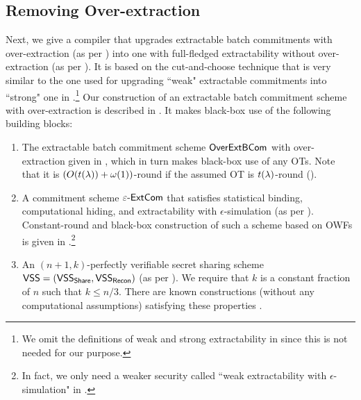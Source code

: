 \subsection{Removing  Over-extraction}
Next, we give a compiler that upgrades extractable batch commitments with over-extraction (as per )
into one with full-fledged extractability without over-extraction (as per ).  
It is based on the cut-and-choose technique that is very similar to the one used for upgrading ``weak" extractable commitments into ``strong" one in \cite{C:CCLY22}.\footnote{We omit the definitions of weak and strong extractability in \cite{C:CCLY22} since this is not needed for our purpose.} 
Our construction of an extractable batch commitment scheme with over-extraction is described in . It makes black-box use of the following building blocks:
\begin{enumerate}
\item
The extractable batch commitment scheme $\mathsf{OverExtBCom}$ with over-extraction given in , which in turn makes black-box use of any OTs.
Note that it is $(O(t(\lambda))+\omega(1))$-round if the assumed OT is $t(\lambda)$-round ().
\item A commitment scheme $\varepsilon\text{-}\mathsf{ExtCom}$ that satisfies statistical binding, computational hiding, and extractability with $\epsilon$-simulation (as per ). 
Constant-round and black-box construction of such a scheme based on OWFs is given in \cite{C:CCLY22}.\footnote{In fact, we only need a weaker security called ``weak extractability with $\epsilon$-simulation" in \cite{C:CCLY22}. 
} 
\item
An $(n+1,k)$-perfectly verifiable secret sharing scheme $\mathsf{VSS} = (\mathsf{VSS}_{\mathsf{Share}}, \mathsf{VSS}_{\mathsf{Recon}})$ (as per ). We require that $k$ is a constant fraction of $n$ such that  $k \le n/3$. There are known constructions (without any computational assumptions) satisfying these properties \cite{STOC:BenGolWig88,EC:CDDHR99}.
\end{enumerate}


